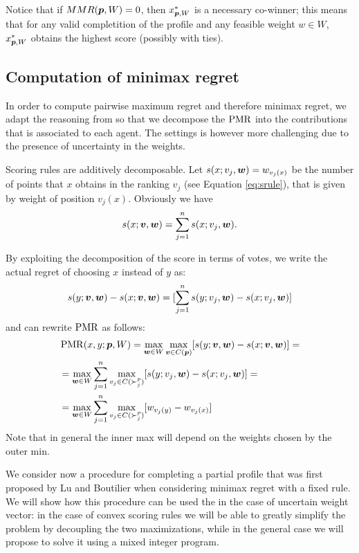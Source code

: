 Notice that if $MMR(\bm{p}, W)=0$, then $x^{*}_{\bm{p},W}$  is a necessary co-winner; this means that for any valid completition of the profile and any feasible weight $w \in W$, $x^{*}_{\bm{p},W}$ obtains the highest score (possibly with ties).

\subsection{Computation of minimax regret}
In order to compute pairwise maximum regret and therefore minimax regret, we adapt the reasoning from \citep{Lu2011} so that we decompose the $\operatorname{PMR}$ into the contributions that is associated to each agent.
The settings is however more challenging due to the presence of uncertainty in the weights.


Scoring rules are additively decomposable.
Let $s(x; v_j,\bm{w})=w_{v_j(x)}$ be the number of points that $x$ obtains in the ranking $v_j$ (see Equation \ref{eq:srule}), that is given by weight of position $v_j(x)$.
Obviously we have 
\[ s(x; \bm{v}, \bm{w}) = \sum_{j=1}^n s(x; v_j,\bm{w}). \]

By exploiting the decomposition of the score in terms of votes, we write the actual regret of choosing $x$ instead of $y$ as:
\[
s(y; \bm{v},\bm{w}) - s(x; \bm{v}, \bm{w}) = [\sum_{j=1}^n s(y; v_j,\bm{w}) - s(x; v_j,\bm{w})]
\]
and  can rewrite $\operatorname{PMR}$ as follows:
\begin{align*}
& \operatorname{PMR}(x,y; \bm{p}, W) = \max_{\bm{w} \in W} \max_{\bm{v} \in C(\bm{p})} [ s(y; \bm{v},\bm{w}) - s(x; \bm{v},\bm{w}) ] = \\
& =  \max_{\bm{w} \in W} \sum_{j=1}^{n} \max_{v_j \in C(\succ_j^p)} [s(y; v_j,\bm{w}) - s(x; v_j,\bm{w})]=\\
& =  \max_{\bm{w} \in W} \sum_{j=1}^{n} \max_{v_j \in C(\succ_j^p)} [w_{v_j(y)} - w_{v_j(x)}] \\
\end{align*}
Note that in general the inner max will depend on the weights chosen by the outer min.

We consider now a procedure for completing a partial profile that was first proposed by Lu and Boutilier \citep{Lu2011} when considering minimax regret with a fixed rule.
We will show how this procedure can be used the in the case of uncertain weight vector:
in the case of convex scoring rules we will be able to greatly simplify the problem by decoupling the two maximizations, while in the general case we will propose to solve it using a mixed integer program.

